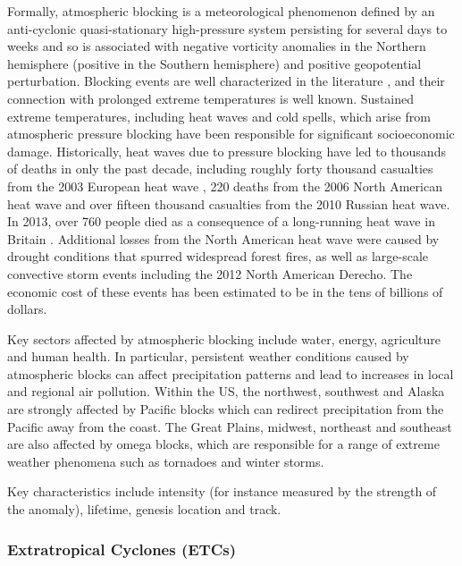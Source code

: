 \documentclass[11pt]{article}
\newcommand\citep{\cite}
\begin{document}
Formally, atmospheric blocking is a meteorological phenomenon defined by an anti-cyclonic quasi-stationary high-pressure system persisting for several days to weeks and so is associated with negative vorticity anomalies in the Northern hemisphere (positive in the Southern hemisphere) and positive geopotential perturbation.  Blocking events are well characterized in the literature \citep{benzi1986anomalous}, and their connection with prolonged extreme temperatures is well known.  Sustained extreme temperatures, including heat waves and cold spells, which arise from atmospheric pressure blocking have been responsible for significant socioeconomic damage.  Historically, heat waves due to pressure blocking have led to thousands of deaths  in only the past decade, including roughly forty thousand casualties from the 2003 European heat wave \citep{bouchama20042003}, 220 deaths from the 2006 North American heat wave and over fifteen thousand casualties from the 2010 Russian heat wave.  In 2013, over 760 people died as a consequence of a long-running heat wave in Britain \citep{upi2013article}.  Additional losses from the North American heat wave were caused by drought conditions that spurred widespread forest fires, as well as large-scale convective storm events including the 2012 North American Derecho.  The economic cost of these events has been estimated to be in the tens of billions of dollars.


Key sectors affected by atmospheric blocking include water, energy, agriculture and human health.  In particular, persistent weather conditions caused by atmospheric blocks can affect precipitation patterns and lead to increases in local and regional air pollution.  Within the US, the northwest, southwest and Alaska are strongly affected by Pacific blocks which can redirect precipitation from the Pacific away from the coast.  The Great Plains, midwest, northeast and southeast are also affected by omega blocks, which are responsible for a range of extreme weather phenomena such as tornadoes and winter storms.

Key characteristics include intensity (for instance measured by the strength of the anomaly), lifetime, genesis location and track.

\subsubsection*{Extratropical Cyclones (ETCs)}
\end{document}
